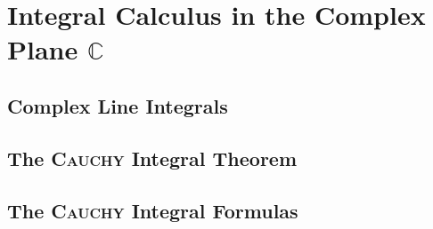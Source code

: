 \chapter{Integral Calculus in the Complex Plane \( \mathbb{C} \)}

\section{Complex Line Integrals}

\section{The \textsc{Cauchy} Integral Theorem}

\section{The \textsc{Cauchy} Integral Formulas}
